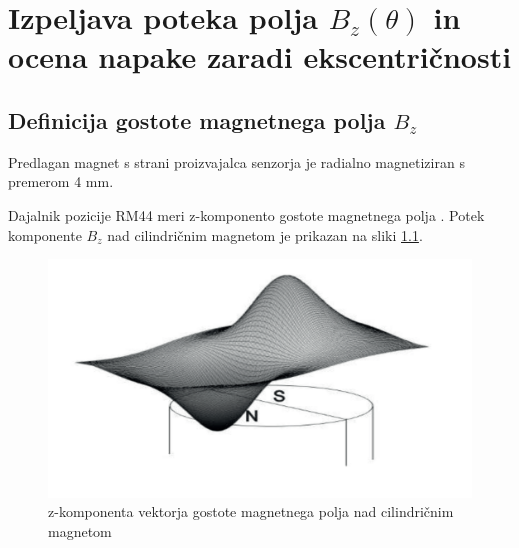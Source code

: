 

\chapter{Izpeljava poteka polja $B_z(\theta)$ in ocena napake zaradi ekscentričnosti}


\section{Definicija  gostote magnetnega polja $B_z$}

Predlagan magnet s strani proizvajalca senzorja je radialno magnetiziran s premerom 4 mm.

Dajalnik pozicije RM44 meri z-komponento gostote magnetnega polja \cite{AM8192}. Potek komponente $B_z$ nad cilindričnim magnetom je prikazan na sliki \ref{fig:magnetno_polje}.




\begin{figure}[h]
	\centering
		\includegraphics[width=0.75\columnwidth]{./Slike/magnetno_polje.jpg}
	\caption{z-komponenta vektorja gostote magnetnega polja nad cilindričnim magnetom \cite{AM8192}}
	\label{fig:magnetno_polje}
\end{figure}


